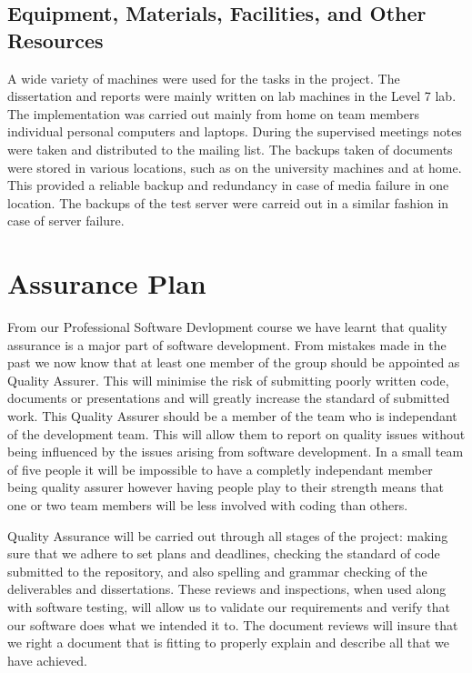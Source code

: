 \documentclass{l3proj}
\begin{document}
\subsection{Equipment, Materials, Facilities, and Other Resources}
A wide variety of machines were used for the tasks in the project. The dissertation and reports were mainly written on lab machines in the Level 7 lab.
The implementation was carried out mainly from home on team members individual personal computers and laptops. \newline
During the supervised meetings notes were taken and distributed to the mailing list.
The backups taken of documents were stored in various locations, such as on the university machines and at home. This provided a reliable backup and redundancy in case of media failure in one location. The backups of the test server were carreid out in a similar fashion in case of server failure.

\section{Assurance Plan}                                                                               
From our Professional Software Devlopment course we have learnt that quality assurance is a major part of software development. From mistakes made in the past we now know that at least one member of the group should be appointed as Quality Assurer. This will minimise the risk of submitting poorly written code, documents or presentations and will greatly increase the standard of submitted work. This Quality Assurer should be a member of the team who is independant of the development team. This will allow them to report on quality issues without being influenced by the issues arising from software development. In a small team of five people it will be impossible to have a completly independant member being quality assurer however having people play to their strength means that one or two team members will be less involved with coding than others.

Quality Assurance will be carried out through all stages of the project: making sure that we adhere to set plans and deadlines, checking the standard of code submitted to the repository, and also spelling and grammar checking of the deliverables and dissertations.
These reviews and inspections, when used along with software testing, will allow us to validate our requirements and verify that our software does what we intended it to. The document reviews will insure that we right a document that is fitting to properly explain and describe all that we have achieved.
\end{document}
